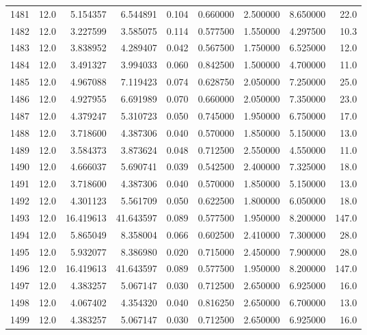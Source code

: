 \begin{tabular}{lrrrrrrrr}
1481 &   12.0 &   5.154357 &   6.544891 &  0.104 &  0.660000 &  2.500000 &   8.650000 &   22.0 \\
1482 &   12.0 &   3.227599 &   3.585075 &  0.114 &  0.577500 &  1.550000 &   4.297500 &   10.3 \\
1483 &   12.0 &   3.838952 &   4.289407 &  0.042 &  0.567500 &  1.750000 &   6.525000 &   12.0 \\
1484 &   12.0 &   3.491327 &   3.994033 &  0.060 &  0.842500 &  1.500000 &   4.700000 &   11.0 \\
1485 &   12.0 &   4.967088 &   7.119423 &  0.074 &  0.628750 &  2.050000 &   7.250000 &   25.0 \\
1486 &   12.0 &   4.927955 &   6.691989 &  0.070 &  0.660000 &  2.050000 &   7.350000 &   23.0 \\
1487 &   12.0 &   4.379247 &   5.310723 &  0.050 &  0.745000 &  1.950000 &   6.750000 &   17.0 \\
1488 &   12.0 &   3.718600 &   4.387306 &  0.040 &  0.570000 &  1.850000 &   5.150000 &   13.0 \\
1489 &   12.0 &   3.584373 &   3.873624 &  0.048 &  0.712500 &  2.550000 &   4.550000 &   11.0 \\
1490 &   12.0 &   4.666037 &   5.690741 &  0.039 &  0.542500 &  2.400000 &   7.325000 &   18.0 \\
1491 &   12.0 &   3.718600 &   4.387306 &  0.040 &  0.570000 &  1.850000 &   5.150000 &   13.0 \\
1492 &   12.0 &   4.301123 &   5.561709 &  0.050 &  0.622500 &  1.800000 &   6.050000 &   18.0 \\
1493 &   12.0 &  16.419613 &  41.643597 &  0.089 &  0.577500 &  1.950000 &   8.200000 &  147.0 \\
1494 &   12.0 &   5.865049 &   8.358004 &  0.066 &  0.602500 &  2.410000 &   7.300000 &   28.0 \\
1495 &   12.0 &   5.932077 &   8.386980 &  0.020 &  0.715000 &  2.450000 &   7.900000 &   28.0 \\
1496 &   12.0 &  16.419613 &  41.643597 &  0.089 &  0.577500 &  1.950000 &   8.200000 &  147.0 \\
1497 &   12.0 &   4.383257 &   5.067147 &  0.030 &  0.712500 &  2.650000 &   6.925000 &   16.0 \\
1498 &   12.0 &   4.067402 &   4.354320 &  0.040 &  0.816250 &  2.650000 &   6.700000 &   13.0 \\
1499 &   12.0 &   4.383257 &   5.067147 &  0.030 &  0.712500 &  2.650000 &   6.925000 &   16.0 \\

\end{tabular}
